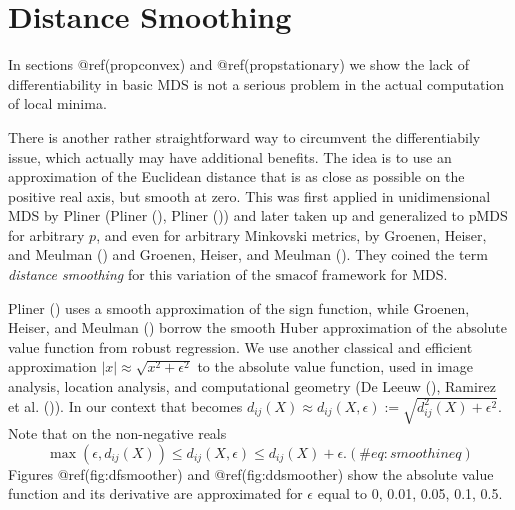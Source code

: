 \documentclass[
  12pt,
  letterpaper,
  DIV=11,
  numbers=noendperiod]{scrreprt}
\theoremstyle{remark}
\begin{document}
\section{Distance Smoothing}\label{propdistsmo}

In sections @ref(propconvex) and @ref(propstationary) we show the lack
of differentiability in basic MDS is not a serious problem in the actual
computation of local minima.

There is another rather straightforward way to circumvent the
differentiabily issue, which actually may have additional benefits. The
idea is to use an approximation of the Euclidean distance that is as
close as possible on the positive real axis, but smooth at zero. This
was first applied in unidimensional MDS by Pliner (Pliner
(), Pliner
()) and later taken up and generalized to
pMDS for arbitrary \(p\), and even for arbitrary Minkovski metrics, by
Groenen, Heiser, and Meulman
() and Groenen, Heiser,
and Meulman (). They
coined the term \emph{distance smoothing} for this variation of the
\(\textrm{smacof}\) framework for MDS.

Pliner () uses a smooth approximation of
the sign function, while Groenen, Heiser, and Meulman
() borrow the smooth Huber
approximation of the absolute value function from robust regression. We
use another classical and efficient approximation
\(|x|\approx\sqrt{x^2+\epsilon^2}\) to the absolute value function, used
in image analysis, location analysis, and computational geometry (De
Leeuw (), Ramirez et al.
()). In our
context that becomes
\(d_{ij}(X)\approx d_{ij}(X,\epsilon):=\sqrt{d_{ij}^2(X)+\epsilon^2}\).
Note that on the non-negative reals \begin{equation}
\max(\epsilon,d_{ij}(X))\leq d_{ij}(X,\epsilon)\leq d_{ij}(X)+\epsilon.
(\#eq:smoothineq)
\end{equation} Figures @ref(fig:dfsmoother) and @ref(fig:ddsmoother)
show the absolute value function and its derivative are approximated for
\(\epsilon\) equal to 0, 0.01, 0.05, 0.1, 0.5.
\end{document}
